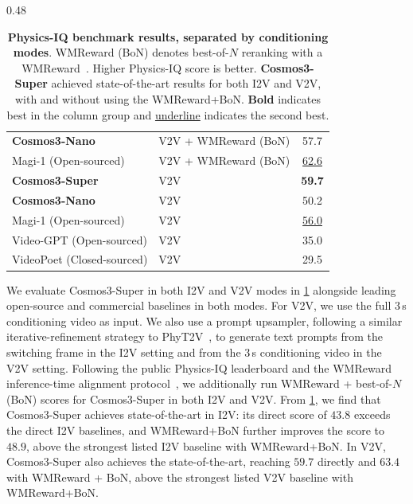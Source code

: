 \documentclass{llmxive}
\begin{document}
\begin{table}[t]
\begin{subtable}{0.48\linewidth}
{\begin{tabular}{l | l c}
            \textbf{Cosmos3-Nano}  & V2V + WMReward (BoN) & 57.7 \\
            Magi-1 (Open-sourced)                       & V2V + WMReward (BoN) & \underline{62.6} \\
            \midrule
            \rowcolor{rowours}
            \textbf{Cosmos3-Super} & V2V                  & \textbf{59.7} \\
            \rowcolor{rowours}
            \textbf{Cosmos3-Nano}  & V2V                  & 50.2 \\
            Magi-1 (Open-sourced)                       & V2V                  & \underline{56.0} \\
            Video-GPT (Open-sourced)                    & V2V                  & 35.0 \\
            VideoPoet (Closed-sourced)                     & V2V                  & 29.5 \\
            \bottomrule
        \end{tabular}
        }
    \end{subtable}
\caption{\textbf{Physics-IQ benchmark results, separated by conditioning modes}. WMReward (BoN) denotes best-of-$N$ reranking with a WMReward~\citep{yuan2026wmreward}. Higher Physics-IQ score is better. \textbf{Cosmos3-Super} achieved state-of-the-art results for both I2V and V2V, with and without using the WMReward+BoN. \textbf{Bold} indicates best in the column group and \underline{underline} indicates the second best.}
\label{tab:physics_iq_results}
\end{table}


We evaluate Cosmos3-Super in both I2V and V2V modes in \cref{tab:physics_iq_results} alongside leading open-source and commercial baselines in both modes.
For V2V, we use the full 3\,s conditioning video as input.
We also use a prompt upsampler, following a similar iterative-refinement strategy to PhyT2V~\citep{xue2025phyt2v}, to generate text prompts from the switching frame in the I2V setting and from the 3\,s conditioning video in the V2V setting.
Following the public Physics-IQ leaderboard and the WMReward inference-time alignment protocol~\citep{yuan2026wmreward}, we additionally run WMReward + best-of-$N$ (BoN) scores for Cosmos3-Super in both I2V and V2V.
From \cref{tab:physics_iq_results}, we find that Cosmos3-Super achieves state-of-the-art in I2V: its direct score of $43.8$ exceeds the direct I2V baselines, and WMReward+BoN further improves the score to $48.9$, above the strongest listed I2V baseline with WMReward+BoN.
In V2V, Cosmos3-Super also achieves the state-of-the-art, reaching $59.7$ directly and $63.4$ with WMReward + BoN, above the strongest listed V2V baseline with WMReward+BoN.
\end{document}
